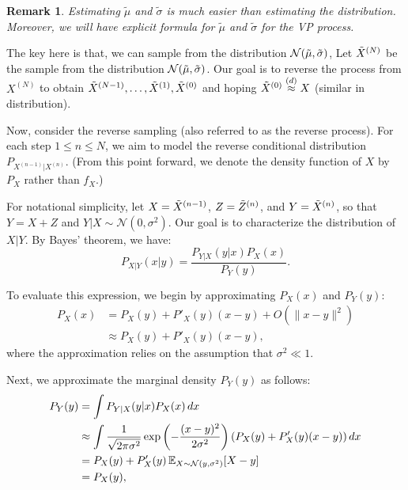 \documentclass[11pt, a4paper]{article}
\newtheorem{remark}{Remark}
\begin{document}
\begin{remark}
Estimating $\tilde{\mu}$ and $\tilde{\sigma}$ is much easier than estimating the distribution.
Moreover, we will have explicit formula for $\tilde{\mu}$ and $\tilde{\sigma}$ for the VP process.
\end{remark}

The key here is that, we can sample from the distribution ${\cal N}(\tilde{\mu}, \tilde{\sigma})$,
Let $\tilde{X}^{(N)}$ be the sample from the distribution ${\cal N}(\tilde{\mu}, \tilde{\sigma})$.
Our goal is to reverse the process from $X^{(N)}$ to obtain $\tilde{X}^{(N-1)}, \dots, \tilde{X}^{(1)}, \tilde{X}^{(0)}$ 
and hoping $\tilde{X}^{(0)} \stackrel{(d)}{\approx} X$ (similar in distribution).

Now, consider the reverse sampling (also referred to as the reverse process).  
For each step \( 1 \leq n \leq N \), we aim to model the reverse conditional distribution \( P_{X^{(n-1)}|X^{(n)}} \). (From this point forward, we denote the density function of \( X \) by \( P_X \) rather than \( f_X \).)  

For notational simplicity, let \( X = \tilde{X}^{(n-1)} \), \( Z = \tilde{Z}^{(n)} \), and \( Y = \tilde{X}^{(n)} \), so that \( Y = X + Z \) and \( Y|X \sim \mathcal{N}(0, \sigma^2) \).  
Our goal is to characterize the distribution of \( X|Y \).  
By Bayes' theorem, we have:
\[
P_{X|Y}(x|y) = \frac{P_{Y|X}(y|x) P_X(x)}{P_Y(y)}.
\]


To evaluate this expression, we begin by approximating \( P_X(x) \) and \( P_Y(y) \):
\begin{align*}
    P_X(x)
    & = P_X(y) + P'_X(y)(x - y) + O(\|x - y\|^2) \\
    & \approx P_X(y) + P'_X(y)(x - y),
\end{align*}
where the approximation relies on the assumption that \( \sigma^2 \ll 1 \).

Next, we approximate the marginal density \( P_Y(y) \) as follows:
\begin{align*}
    P_Y(y)
    & = \int P_{Y|X}(y|x) P_X(x) \, dx \\
    & \approx \int \frac{1}{\sqrt{2\pi\sigma^2}} \exp\left( -\frac{(x - y)^2}{2\sigma^2} \right) \left(P_X(y) + P'_X(y)(x - y)\right) dx \\
    & = P_X(y) + P'_X(y) \, \mathbb{E}_{X \sim \mathcal{N}(y, \sigma^2)}[X - y] \\
    & = P_X(y),
\end{align*}
\end{document}
